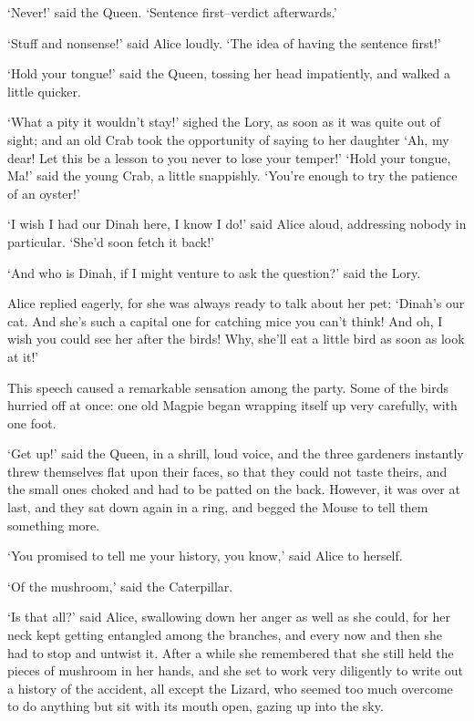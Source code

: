 \documentclass[statementpaper,twoside,openany]{memoir}
\begin{document}
`Never!' said the Queen. `Sentence first--verdict afterwards.'

`Stuff and nonsense!' said Alice loudly. `The idea of having the sentence first!'

`Hold your tongue!' said the Queen, tossing her head impatiently, and walked a little quicker.

`What a pity it wouldn't stay!' sighed the Lory, as soon as it was quite out of sight; and an old Crab took the opportunity of saying to her daughter `Ah, my dear! Let this be a lesson to you never to lose your temper!' `Hold your tongue, Ma!' said the young Crab, a little snappishly. `You're enough to try the patience of an oyster!'

`I wish I had our Dinah here, I know I do!' said Alice aloud, addressing nobody in particular. `She'd soon fetch it back!'

`And who is Dinah, if I might venture to ask the question?' said the Lory.

Alice replied eagerly, for she was always ready to talk about her pet: `Dinah's our cat. And she's such a capital one for catching mice you can't think! And oh, I wish you could see her after the birds! Why, she'll eat a little bird as soon as look at it!'

This speech caused a remarkable sensation among the party. Some of the birds hurried off at once: one old Magpie began wrapping itself up very carefully, with one foot.

`Get up!' said the Queen, in a shrill, loud voice, and the three gardeners instantly threw themselves flat upon their faces, so that they could not taste theirs, and the small ones choked and had to be patted on the back. However, it was over at last, and they sat down again in a ring, and begged the Mouse to tell them something more.

`You promised to tell me your history, you know,' said Alice to herself.

`Of the mushroom,' said the Caterpillar.

`Is that all?' said Alice, swallowing down her anger as well as she could, for her neck kept getting entangled among the branches, and every now and then she had to stop and untwist it. After a while she remembered that she still held the pieces of mushroom in her hands, and she set to work very diligently to write out a history of the accident, all except the Lizard, who seemed too much overcome to do anything but sit with its mouth open, gazing up into the sky.
\end{document}
